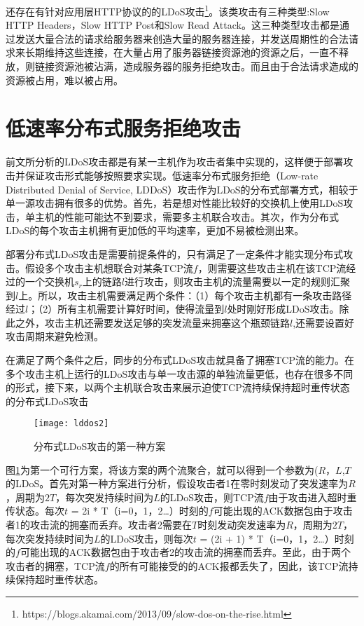 还存在有针对应用层HTTP协议的的LDoS攻击\footnote{https://blogs.akamai.com/2013/09/slow-dos-on-the-rise.html}。该类攻击有三种类型:Slow HTTP Headers，Slow HTTP Post和Slow Read Attack。这三种类型攻击都是通过发送大量合法的请求给服务器来创造大量的服务器连接，并发送周期性的合法请求来长期维持这些连接，在大量占用了服务器链接资源池的资源之后，一直不释放，则链接资源池被沾满，造成服务器的服务拒绝攻击。而且由于合法请求造成的资源被占用，难以被占用。

\section{低速率分布式服务拒绝攻击}
前文所分析的LDoS攻击都是有某一主机作为攻击者集中实现的，这样便于部署攻击并保证攻击形式能够按照要求实现。低速率分布式服务拒绝（Low-rate Distributed Denial of Service, LDDoS）攻击作为LDoS的分布式部署方式，相较于单一源攻击拥有很多的优势。首先，若是想对性能比较好的交换机上使用LDoS攻击，单主机的性能可能达不到要求，需要多主机联合攻击。其次，作为分布式LDoS的每个攻击主机拥有更加低的平均速率，更加不易被检测出来。

部署分布式LDoS攻击是需要前提条件的，只有满足了一定条件才能实现分布式攻击。假设多个攻击主机想联合对某条TCP流$f$，则需要这些攻击主机在该TCP流经过的一个交换机$s_r$上的链路$l$进行攻击，则攻击主机的流量需要以一定的规则汇聚到$l$上。所以，攻击主机需要满足两个条件：（1）每个攻击主机都有一条攻击路径经过$l$；（2）所有主机需要计算好时间，使得流量到$l$处时刚好形成LDoS攻击。除此之外，攻击主机还需要发送足够的突发流量来拥塞这个瓶颈链路$l$,还需要设置好攻击周期来避免检测。

在满足了两个条件之后，同步的分布式LDoS攻击就具备了拥塞TCP流的能力。在多个攻击主机上运行的LDoS攻击与单一攻击源的单独流量更低，也存在很多不同的形式，接下来，以两个主机联合攻击来展示迫使TCP流持续保持超时重传状态的分布式LDoS攻击


\begin{figure}
    \centering
    \texttt{[image: lddos2]}
    \caption{分布式LDoS攻击的第一种方案}
    \label{fig:lldos1}
\end{figure}
图\ref{fig:lldos1}为第一个可行方案，将该方案的两个流聚合，就可以得到一个参数为($R$，$L$,$T$的LDoS。首先对第一种方案进行分析，假设攻击者1在零时刻发动了突发速率为$R$，周期为$2T$，每次突发持续时间为$L$的LDoS攻击，则TCP流$f$由于攻击进入超时重传状态。每次$t$ = 2i * T（i=0，1，2…）时刻的$f$可能出现的ACK数据包由于攻击者1的攻击流的拥塞而丢弃。攻击者2需要在$T$时刻发动突发速率为$R$，周期为$2T$，每次突发持续时间为$L$的LDoS攻击，则每次$t$ = (2i + 1) * T（i=0，1，2…）时刻的$f$可能出现的ACK数据包由于攻击者2的攻击流的拥塞而丢弃。至此，由于两个攻击者的拥塞，TCP流$f$的所有可能接受的的ACK报都丢失了，因此，该TCP流持续保持超时重传状态。

